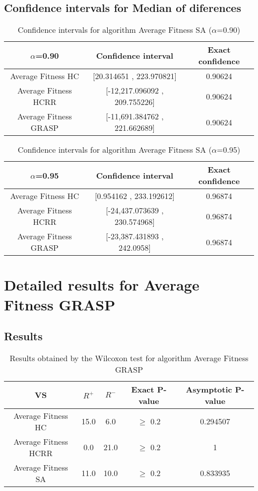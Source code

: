 \documentclass[a4paper,10pt]{article}
\begin{document}
\subsection{Confidence intervals for Median of diferences}

\begin{table}[!htp]
\centering\small
\begin{tabular}{
|c|c|c|}
\hline
 $\alpha$=0.90 & Confidence interval & Exact confidence \\ \hline 
Average Fitness HC     & [20.314651 , 223.970821] & 0.90624\\ \hline 
Average Fitness HCRR    & [-12,217.096092 , 209.755226] & 0.90624\\ \hline 
Average Fitness GRASP & [-11,691.384762 , 221.662689] & 0.90624\\ \hline 

\end{tabular}
\caption{Confidence intervals for algorithm Average Fitness SA   ($\alpha$=0.90)}
\end{table}
\begin{table}[!htp]
\centering\small
\begin{tabular}{
|c|c|c|}
\hline
 $\alpha$=0.95 & Confidence interval & Exact confidence \\ \hline 
Average Fitness HC     & [0.954162 , 233.192612] & 0.96874\\ \hline 
Average Fitness HCRR    & [-24,437.073639 , 230.574968] & 0.96874\\ \hline 
Average Fitness GRASP & [-23,387.431893 , 242.0958] & 0.96874\\ \hline 

\end{tabular}
\caption{Confidence intervals for algorithm Average Fitness SA   ($\alpha$=0.95)}
\end{table}

 \clearpage 


\section{Detailed results for Average Fitness GRASP}


\subsection{Results}

\begin{table}[!htp]
\centering\small
\begin{tabular}{
|c|c|c|c|c|}
\hline
 VS & $R^{+}$ & $R^{-}$ & Exact P-value & Asymptotic P-value \\ \hline 
Average Fitness HC     & 15.0 & 6.0 & $\geq$ 0.2 & 0.294507\\ \hline 
Average Fitness HCRR    & 0.0 & 21.0 & $\geq$ 0.2 & 1\\ \hline 
Average Fitness SA   & 11.0 & 10.0 & $\geq$ 0.2 & 0.833935\\ \hline 

\end{tabular}
\caption{Results obtained by the Wilcoxon test for algorithm Average Fitness GRASP}
\end{table}
\end{document}
